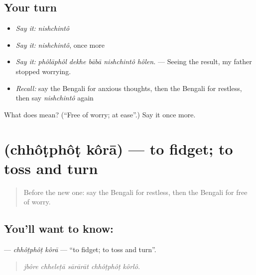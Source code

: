 \subsection*{Your turn}
\begin{itemize}
\raggedright
  \item \emph{Say it:} \emph{nishchintô}
  \item \emph{Say it:} \emph{nishchintô}, once more
  \item \emph{Say it:} \emph{phôlāphôl dekhe bābā nishchintô hôlen.} — Seeing the result, my father stopped worrying.
  \item \emph{Recall:} say the Bengali for anxious thoughts, then the Bengali for restless, then say \emph{nishchintô} again
\end{itemize}

\begin{tcolorbox}[breakable,colback=teal!4,colframe=teal!35!black,title={Before you move on}]
What does  mean? (\textquotedblleft{}Free of worry; at ease\textquotedblright{}.) Say it once more.
\end{tcolorbox}
\section[\texorpdfstring{\bn{ছটফট} \bn{করা} (chhôṭphôṭ kôrā)}{ছটফট করা (chhôṭphôṭ kôrā)}]{  (chhôṭphôṭ kôrā) — to fidget; to toss and turn}

\label{lesson:BN-C442-chhotphot-kora}



\begin{quote}
Before the new one: say the Bengali for restless, then the Bengali for free of worry.
\end{quote}

\subsection*{You'll want to know:  }
\textbf{ } — \emph{chhôṭphôṭ kôrā} — \textquotedblleft{}to fidget; to toss and turn\textquotedblright{}.

\begin{quote}
    
\end{quote}

\begin{quote}
\emph{jbôre chheleṭā sārārāt chhôṭphôṭ kôrlô.}
\end{quote}

